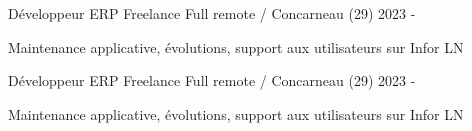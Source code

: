 

\begin{cventries}

  \cventry
    {Développeur ERP} %
    {Freelance} %
    {Full remote / Concarneau (29)} %
    {2023 - } %
    {
      \begin{cvitems} %
        \item {Maintenance applicative, évolutions, support aux utilisateurs sur Infor LN}
      \end{cvitems}
    }

  \cventry
    {Développeur ERP} %
    {Freelance} %
    {Full remote / Concarneau (29)} %
    {2023 - } %
    {
      \begin{cvitems} %
        \item {Maintenance applicative, évolutions, support aux utilisateurs sur Infor LN}
      \end{cvitems}
    }


\end{cventries}
